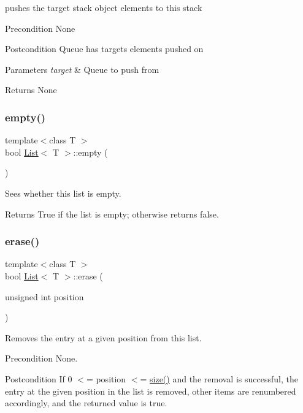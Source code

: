 pushes the target stack object elements to this stack \begin{DoxyPrecond}{Precondition}
None 
\end{DoxyPrecond}
\begin{DoxyPostcond}{Postcondition}
Queue has target\textquotesingle{}s elements pushed on 
\end{DoxyPostcond}

\begin{DoxyParams}{Parameters}
{\em target} & Queue to push from \\
\hline
\end{DoxyParams}
\begin{DoxyReturn}{Returns}
None 
\end{DoxyReturn}
\mbox{\label{class_list_a3737ca60365287ce663393d8c07d1a41}} 
\subsubsection{\texorpdfstring{empty()}{empty()}}
{\footnotesize\ttfamily template$<$class T $>$ \\
bool \hyperlink{class_list}{List}$<$ T $>$\+::empty (\begin{DoxyParamCaption}{ }\end{DoxyParamCaption})}

Sees whether this list is empty. \begin{DoxyReturn}{Returns}
True if the list is empty; otherwise returns false. 
\end{DoxyReturn}
\mbox{\label{class_list_a0af93f391664cbd3476b1a0fe0d3619e}} 
\subsubsection{\texorpdfstring{erase()}{erase()}}
{\footnotesize\ttfamily template$<$class T $>$ \\
bool \hyperlink{class_list}{List}$<$ T $>$\+::erase (\begin{DoxyParamCaption}\item[{unsigned int}]{position }\end{DoxyParamCaption})}

Removes the entry at a given position from this list. \begin{DoxyPrecond}{Precondition}
None. 
\end{DoxyPrecond}
\begin{DoxyPostcond}{Postcondition}
If 0 $<$= position $<$= \hyperlink{class_list_aec8852ab225094e14ad424e8d71a4dac}{size()} and the removal is successful, the entry at the given position in the list is removed, other items are renumbered accordingly, and the returned value is true. 
\end{DoxyPostcond}


